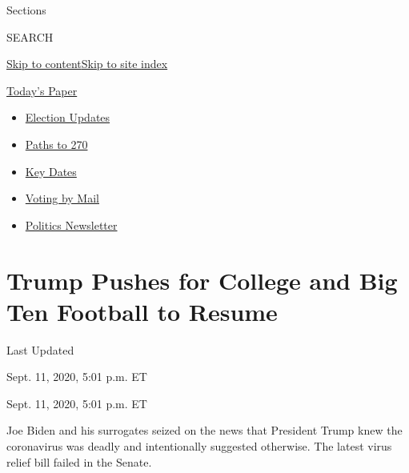 Sections

SEARCH

\protect\hyperlink{site-content}{Skip to
content}\protect\hyperlink{site-index}{Skip to site index}

\href{https://myaccount.nytimes3xbfgragh.onion/auth/login?response_type=cookie\&client_id=vi}{}

\href{https://www.nytimes3xbfgragh.onion/section/todayspaper}{Today's
Paper}

\begin{itemize}
\item
  \href{https://www.nytimes3xbfgragh.onion/live/2020/09/11/us/trump-vs-biden?action=click\&pgtype=Article\&state=default\&region=TOP_BANNER\&context=storylines_menu}{Election
  Updates}
\item
  \href{https://www.nytimes3xbfgragh.onion/interactive/2020/us/elections/election-states-biden-trump.html?action=click\&pgtype=Article\&state=default\&region=TOP_BANNER\&context=storylines_menu}{Paths
  to 270}
\item
  \href{https://www.nytimes3xbfgragh.onion/interactive/2019/us/elections/2020-presidential-election-calendar.html?action=click\&pgtype=Article\&state=default\&region=TOP_BANNER\&context=storylines_menu}{Key
  Dates}
\item
  \href{https://www.nytimes3xbfgragh.onion/interactive/2020/08/31/us/politics/vote-by-mail-deadlines.html?action=click\&pgtype=Article\&state=default\&region=TOP_BANNER\&context=storylines_menu}{Voting
  by Mail}
\item
  \href{https://www.nytimes3xbfgragh.onion/newsletters/politics?action=click\&pgtype=Article\&state=default\&region=TOP_BANNER\&context=storylines_menu}{Politics
  Newsletter}
\end{itemize}

\hypertarget{trump-pushes-for-college-and-big-ten-football-to-resume}{%
\section{Trump Pushes for College and Big Ten Football to
Resume}\label{trump-pushes-for-college-and-big-ten-football-to-resume}}

Last Updated

Sept. 11, 2020, 5:01 p.m. ET

Sept. 11, 2020, 5:01 p.m. ET

Joe Biden and his surrogates seized on the news that President Trump
knew the coronavirus was deadly and intentionally suggested otherwise.
The latest virus relief bill failed in the Senate.

